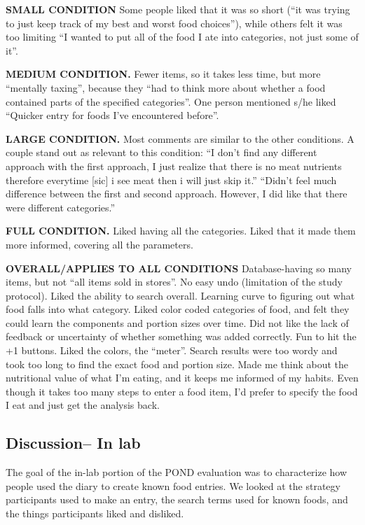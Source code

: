 \textbf{SMALL CONDITION}
Some people liked that it was so short (``it was trying to just keep track of my best and worst food choices''), while others felt it was too limiting ``I wanted to put all of the food I ate into categories, not just some of it''. 

\textbf{MEDIUM CONDITION.}
Fewer items, so it takes less time, but more ``mentally taxing'', because they ``had to think more about whether a food contained parts of the specified categories''. One person mentioned s/he liked ``Quicker entry for foods I've encountered before''. 

\textbf{LARGE CONDITION.}
Most comments are similar to the other conditions. A couple stand out as relevant to this condition: ``I don't find any different approach with the first approach, I just realize that there is no meat nutrients therefore everytime [sic] i see meat then i will just skip it.'' ``Didn't feel much difference between the first and second approach. However, I did like that there were different categories.''

\textbf{FULL CONDITION.}
Liked having all the categories. Liked that it made them more informed, covering all the parameters. 

\textbf{OVERALL/APPLIES TO ALL CONDITIONS}
Database-having so many items, but not ``all items sold in stores''. No easy undo (limitation of the study protocol). Liked the ability to search overall. Learning curve to figuring out what food falls into what category. Liked color coded categories of food, and felt they could learn the components and portion sizes over time. Did not like the lack of feedback or uncertainty of whether something was added correctly. Fun to hit the +1 buttons. Liked the colors, the ``meter''. Search results were too wordy and took too long to find the exact food and portion size. Made me think about the nutritional value of what I'm eating, and it keeps me informed of my habits. Even though it takes too many steps to enter a food item, I'd prefer to specify the food I eat and just get the analysis back. 


\subsection{Discussion-- In lab}

The goal of the in-lab portion of the POND evaluation was to characterize how people used the diary to create known food entries. We looked at the strategy participants used to make an entry, the search terms used for known foods, and the things participants liked and disliked. 

